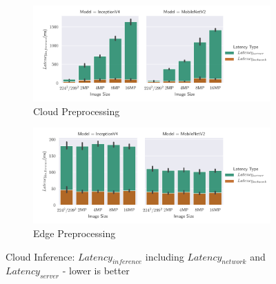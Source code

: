 \begin{figure}[!htb]
\centering
\begin{subfigure}[b]{0.95\textwidth}
   \includegraphics[width=1\linewidth]{./Bilder/single_plots/cloud_inference_plots/Cloud_Server_+_NetworkLatencies_cloudprepro.pdf}
   \caption{Cloud Preprocessing}
   \label{fig:CloudInferenceratioCloudtotal} 
\end{subfigure}

\begin{subfigure}[b]{0.95\textwidth}
   \includegraphics[width=1\linewidth]{./Bilder/single_plots/cloud_inference_plots/Cloud_Server_+_NetworkLatencies_edgeprepro.pdf}
   \caption{Edge Preprocessing}
   \label{fig:CloudInferenceRatioEdgetotal}
\end{subfigure}

\caption{Cloud Inference:  $Latency_{inference}$ including $Latency_{network}$ and $Latency_{server}$ - lower is better}
\end{figure}

